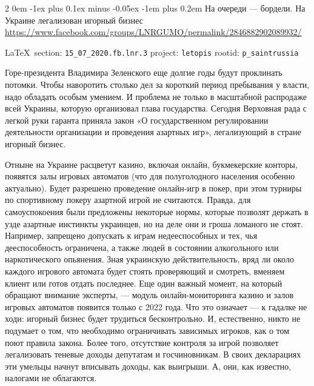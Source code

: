 \documentclass[a4paper,11pt]{extreport}
\makeatletter
\renewcommand\subsection{%
  \clearpage
    \@startsection{subsection}%
    {2}%
    {0em}%
    {-1ex plus 0.1ex minus -0.05ex}%
    {-1em plus 0.2em}%
    {\scshape\bfseries\Large}%
}
\makeatother
\begin{document}
 
  
  
\subsection{На очереди --- бордели. На Украине легализован игорный бизнес}
\label{sec:15_07_2020.fb.lnr.3}
\url{https://www.facebook.com/groups/LNRGUMO/permalink/2846882902089932/}


\vspace{0.5cm}
{\ifDEBUG\small\LaTeX~section: \verb|15_07_2020.fb.lnr.3| project: \verb|letopis| rootid: \verb|p_saintrussia|\fi}
\vspace{0.5cm}

\cite{15_07_2020.fb.lnr.3}


Горе-президента Владимира Зеленского еще долгие годы будут проклинать потомки.
Чтобы наворотить столько дел за короткий период пребывания у власти, надо
обладать особым умением. И проблема не только в масштабной распродаже всей
Украины, которую организовал глава государства. Сегодня Верховная рада с легкой
руки гаранта приняла закон «О государственном регулировании деятельности
организации и проведения азартных игр», легализующий в стране игорный бизнес.

Отныне на Украине расцветут казино, включая онлайн, букмекерские конторы,
появятся залы игровых автоматов (что для полуголодного населения особенно
актуально). Будет разрешено проведение онлайн-игр в покер, при этом турниры по
спортивному покеру азартной игрой не считаются.  Правда, для самоуспокоения
были предложены некоторые нормы, которые позволят держать в узде азартные
инстинкты украинцев, но на деле они и гроша ломаного не стоят. Например,
запрещено допускать к играм недееспособных и тех, чья дееспособность
ограничена, а также людей в состоянии алкогольного или наркотического
опьянения. Зная украинскую действительность, вряд ли около каждого игрового
автомата будет стоять проверяющий и смотреть, вменяем клиент или готов отдать
последнее. Еще один важный момент, на который обращают внимание эксперты, —
модуль онлайн-мониторинга казино и залов игровых автоматов появится только с
2022 года. Что это означает --- к гадалке не ходи: игорный бизнес будет трудиться
бесконтрольно. И, естественно, никто не подумает о том, что необходимо
ограничивать зависимых игроков, как о том поют правила закона. Более того,
отсутствие контроля за игрой позволяет легализовать теневые доходы депутатам и
госчиновникам. В своих декларациях эти умельцы начнут вписывать доходы, как
выигрыши. А, они, как известно, налогами не облагаются.
\end{document}
